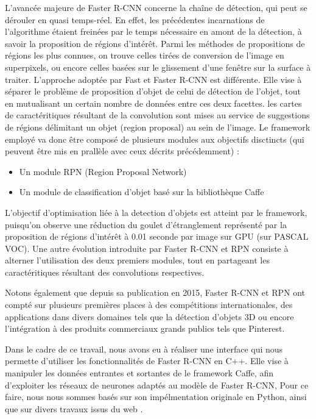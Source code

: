       L'avancée majeure de Faster R-CNN concerne la chaîne de détection, qui peut se dérouler en quasi temps-réel. 
      En effet, les précédentes incarnations de l'algorithme étaient freinées par le temps nécessaire en amont de la détection, à savoir la proposition de régions d'intérêt. 
      Parmi les méthodes de propositions de régions les plus connues, on trouve celles tirées de conversion de l'image en superpixels, ou encore celles basées sur le glissement d'une fenêtre sur la surface à traiter. 
      L'approche adoptée par Fast et Faster R-CNN est différente. 
      Elle vise à séparer le problème de proposition d'objet de celui de détection de l'objet, tout en mutualisant un certain nombre de données entre ces deux facettes. 
      les cartes de caractéritiques résultant de la convolution sont mises au service de suggestions de régions délimitant un objet (region proposal) au sein de l'image. 
      Le framework employé va donc être composé de plusieurs modules aux objectifs disctincts (qui peuvent être mis en prallèle avec ceux décrits précédemment) : 
      
      \begin{itemize}
       \item Un module RPN (Region Proposal Network)
       \item Un module de classification d'objet basé sur la bibliothèque Caffe
      \end{itemize}
      
      L'objectif d'optimisation liée à la detection d'objets est atteint par le framework, 
      puisqu'on observe une réduction du goulet d'étranglement représenté par la proposition de régions d'intérêt à 0.01 seconde par image sur GPU (sur PASCAL VOC). 
      Une autre évolution introduite par Faster R-CNN et RPN consiste à alterner l'utilisation des deux premiers modules, tout en partageant les caractéritiques résultant des convolutions respectives. 
      
      Notons également que depuis sa publication en 2015, Faster R-CNN et RPN ont compté sur plusieurs premières places à des compétitions internationales, des applications dans divers domaines tels que la détection
      d'objets 3D ou encore l'intégration à des produits commerciaux grands publics tels que Pinterest. 
      
      Dans le cadre de ce travail, nous avons eu à réaliser une interface qui nous permette d'utiliser les fonctionnalités de Faster R-CNN en C++. 
      Elle vise à manipuler les données entrantes et sortantes de le framework Caffe, afin d'exploiter les réseaux de neurones adaptés au modèle de Faster R-CNN,   
      Pour ce faire, nous nous sommes basés sur son impélmentation originale en Python, ainsi que sur divers travaux issus du web \cite{Bib_FasterRCNN_encapsulation}.  
      

